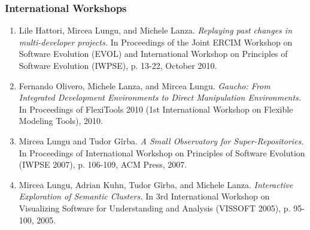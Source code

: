 \subsubsection*{International Workshops}
\begin{enumerate}
\item Lile Hattori, Mircea Lungu, and Michele Lanza. \emph{Replaying past changes in multi-developer projects.} In Proceedings of the Joint ERCIM Workshop on Software Evolution (EVOL) and International Workshop on Principles of Software Evolution (IWPSE), p. 13-22, October 2010.
\item Fernando Olivero, Michele Lanza, and Mircea Lungu. \emph{Gaucho: From Integrated Development Environments to Direct Manipulation Environments.} In Proceedings of FlexiTools 2010 (1st International Workshop on Flexible Modeling Tools), 2010.
\item 
Mircea Lungu and Tudor G\^irba. \emph{A Small Observatory for Super-Repositories.} In Proceedings of International Workshop on Principles of Software Evolution (IWPSE 2007), p. 106-109, ACM Press, 2007.
\item Mircea Lungu, Adrian Kuhn, Tudor G\^irba, and Michele Lanza. \emph{Interactive Exploration of Semantic Clusters.} In 3rd International Workshop on Visualizing Software for Understanding and Analysis (VISSOFT 2005), p. 95-100, 2005.

\end{enumerate}
